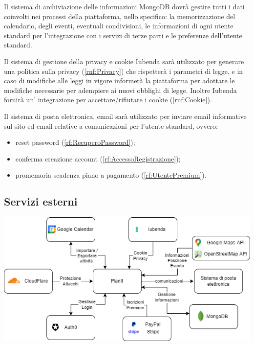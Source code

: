 \begin{listaPersonale}[BE]{}
 Il sistema di archiviazione delle informazioni MongoDB dovrà gestire tutti i dati coinvolti nei processi della piattaforma, nello specifico: la memorizzazione del calendario, degli eventi, eventuali condivisioni, le informazioni di ogni utente standard per l'integrazione con i servizi di terze parti e le preferenze dell'utente standard.

 Il sistema di gestione della privacy e cookie Iubenda sarà utilizzato per generare una politica sulla privacy (\ref{rnf:Privacy}) che rispetterà i parametri di legge, e in caso di modifiche alle leggi in vigore informerà la piattaforma per adottare le modifiche necessarie per adempiere ai nuovi obblighi di legge. Inoltre Iubenda fornirà un' integrazione per accettare/rifiutare i cookie (\ref{rnf:Cookie}).

 Il sistema di posta elettronica, email sarà utilizzato per inviare email informative sul sito ed email relative a comunicazioni per l'utente standard, ovvero:
\begin{itemize}
    \item reset password (\ref{rf:RecuperoPassword});
    \item conferma creazione account (\ref{rf:AccessoRegistrazione});
    \item promemoria scadenza piano a pagamento (\ref{rf:UtentePremium}).
\end{itemize}
\end{listaPersonale}

\subsection*{Servizi esterni}
\begin{center}
    \includegraphics[width=1\textwidth]{img/Servizi/Servizi esterni.drawio.png}
\end{center}